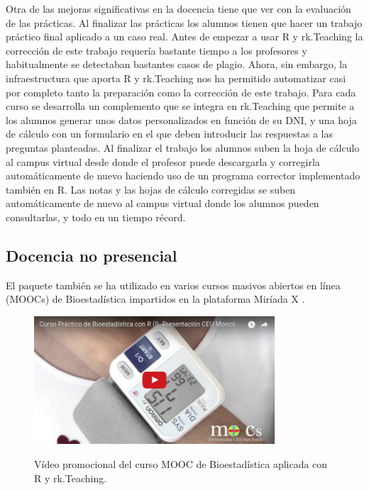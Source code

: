 \documentclass[a4paper,10pt,twoside]{article}
\newcommand{\rkteaching}{\textsf{rk.Teaching}}
\begin{document}
Otra de las mejoras significativas en la docencia tiene que ver con la evaluación de las prácticas.
Al finalizar las prácticas los alumnos tienen que hacer un trabajo práctico final aplicado a un caso real.
Antes de empezar a usar R y \rkteaching{} la corrección de este trabajo requería bastante tiempo a los profesores y
habitualmente se detectaban bastantes casos de plagio.
Ahora, sin embargo, la infraestructura que aporta R y \rkteaching{} nos ha permitido automatizar casi por completo tanto
la preparación como la corrección de este trabajo. 
Para cada curso se desarrolla un complemento que se integra en \rkteaching{} que permite a los alumnos generar unos
datos personalizados en función de su DNI, y una hoja de cálculo con un formulario en el que deben introducir las respuestas a
las preguntas planteadas.
Al finalizar el trabajo los alumnos suben la hoja de cálculo al campus virtual desde donde el profesor puede
descargarla y corregirla automáticamente de nuevo haciendo uso de un programa corrector implementado también en R.
Las notas y las hojas de cálculo corregidas se suben automáticamente de nuevo al campus virtual donde los alumnos pueden
consultarlas, y todo en un tiempo récord. 

\subsection{Docencia no presencial}
El paquete también se ha utilizado en varios cursos masivos abiertos en línea (MOOCs) de Bioestadística impartidos
en la plataforma Miríada X \cite{sanchez2013curso}.

\begin{figure}[htp]
\begin{center}
\href{https://youtu.be/BTFOsbzInZo}{\includegraphics[width=0.8\textwidth]{img/mooc.png}}
\caption{Vídeo promocional del curso MOOC de Bioestadística aplicada con R y rk.Teaching.}
\label{f:mooc}
\end{center}
\end{figure}
\end{document}
